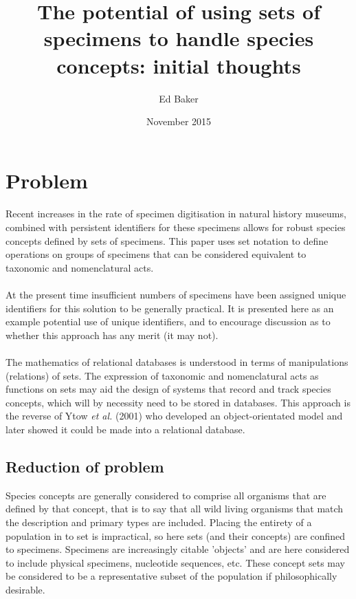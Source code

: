 \documentclass{article}
\title{The potential of using sets of specimens to handle species concepts: initial thoughts}
\author{Ed Baker}
\date{November 2015}
\begin{document}
   \maketitle
   \section{Problem}
   \paragraph{}
   Recent increases in the rate of specimen digitisation in natural history museums, combined with persistent identifiers for these specimens allows for robust species concepts defined by sets of specimens. This paper uses set notation to define operations on groups of specimens that can be considered equivalent to taxonomic and nomenclatural acts.
   \paragraph{}
   At the present time insufficient numbers of specimens have been assigned unique identifiers for this solution to be generally practical. It is presented here as an example potential use of unique identifiers, and to encourage discussion as to whether this approach has any merit (it may not).
   \paragraph{}
   The mathematics of relational databases is understood in terms of manipulations (relations) of sets. The expression of taxonomic and nomenclatural acts as functions on sets may aid the design of systems that record and track species concepts, which will by necessity need to be stored in databases. This approach is the reverse of Ytow \textit{et al.} (2001) who developed an object-orientated model and later showed it could be made into a relational database.
   \subsection{Reduction of problem}
   Species concepts are generally considered to comprise all organisms that are defined by that concept, that is to say that all wild living organisms that match the description and primary types are included. Placing the entirety of a population in to set is impractical, so here sets (and their concepts) are confined to specimens. Specimens are increasingly citable 'objects' and are here considered to include physical specimens, nucleotide sequences, etc. These concept sets may be considered to be a representative subset of the population if philosophically desirable.
\end{document}
